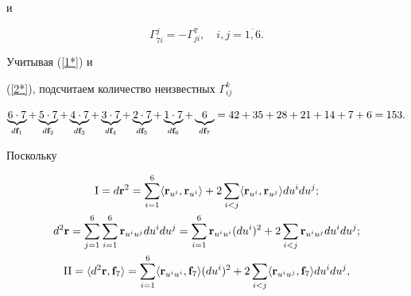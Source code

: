 и


\begin{equation}


\Gamma_{7i}^j=-\Gamma_{ji}^7,\quad i,j=\overline{1,6}.


\label{2*}


\end{equation}


Учитывая (\ref{1*}) и


(\ref{2*}), подсчитаем количество неизвестных $\Gamma_{ij}^k$


$$


\underbrace{6\cdot 7}_{d\bold{f}_1}+\underbrace{5\cdot


7}_{d\bold{f}_2}+\underbrace{4\cdot


7}_{d\bold{f}_3}+\underbrace{3\cdot


7}_{d\bold{f}_4}+\underbrace{2\cdot 7}_{d\bold{f}_5}


+\underbrace{1\cdot


7}_{d\bold{f}_6}+\underbrace{6}_{d\bold{f}_7}=42+35+28+21


+14+7+6=153.


$$


Поскольку


\begin{gather*}


\mati=d\bold{r}^2=\sum\limits_{i=1}^6


\langle


\bold{r}_{u^i},\bold{r}_{u^i}\rangle+2\sum\limits_{i<j}


\langle\bold{r}_{u^i},\bold{r}_{u^j}\rangle du^idu^j;\\


%


d^2\bold{r}=\sum\limits_{j=1}^6\sum\limits_{i=1}^6


\bold{r}_{u^iu^j}du^idu^j=\sum\limits_{i=1}^6\bold{r}_{u^


iu^i}


(du^i)^2+2\sum\limits_{i<j}\bold{r}_{u^iu^j}du^idu^j;\\


%


\matii=\langle d^2\bold{r},\bold{f}_7\rangle=


\sum\limits_{i=1}^6\langle\bold{r}_{u^iu^i},\bold{f}_7


\rangle(du^i)^2+2\sum\limits_{i<j}


\langle\bold{r}_{u^iu^j},\bold{f}_7\rangle du^idu^j,


\end{gather*}


